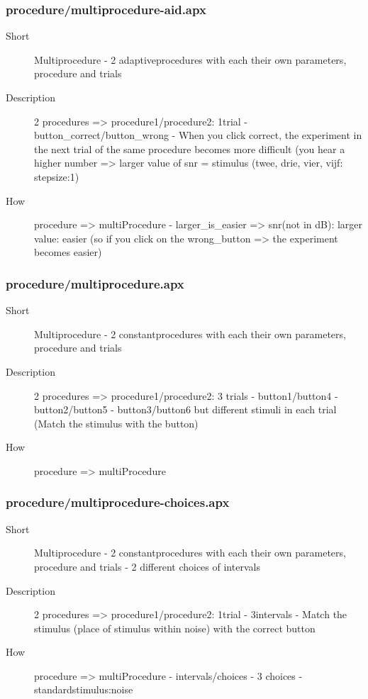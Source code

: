 \subsubsection{procedure/multiprocedure-aid.apx}
\begin{description}
\item[Short] 
 Multiprocedure - 2 adaptiveprocedures with each their own parameters, procedure and trials
\item[Description] 
 2 procedures =\textgreater{} procedure1/procedure2: 1trial - button\_correct/button\_wrong - When you click correct, the experiment in the next trial of the same procedure becomes more difficult (you hear a higher number =\textgreater{} larger value of snr = stimulus (twee, drie, vier, vijf: stepsize:1)
\item[How] 
 procedure =\textgreater{} multiProcedure - larger\_is\_easier =\textgreater{} snr(not in dB): larger value: easier (so if you click on the wrong\_button =\textgreater{} the experiment becomes easier)
\end{description}

\subsubsection{procedure/multiprocedure.apx}
\begin{description}
\item[Short] 
 Multiprocedure - 2 constantprocedures with each their own parameters, procedure and trials
\item[Description] 
 2 procedures =\textgreater{} procedure1/procedure2: 3 trials - button1/button4 - button2/button5 - button3/button6 but different stimuli in each trial (Match the stimulus with the button)
\item[How] 
 procedure =\textgreater{} multiProcedure
\end{description}

\subsubsection{procedure/multiprocedure-choices.apx}
\begin{description}
\item[Short] 
 Multiprocedure - 2 constantprocedures with each their own parameters, procedure and trials - 2 different choices of intervals
\item[Description] 
 2 procedures =\textgreater{} procedure1/procedure2: 1trial - 3intervals - Match the stimulus (place of stimulus within noise) with the correct button
\item[How] 
 procedure =\textgreater{} multiProcedure - intervals/choices - 3 choices - standardstimulus:noise
\end{description}

